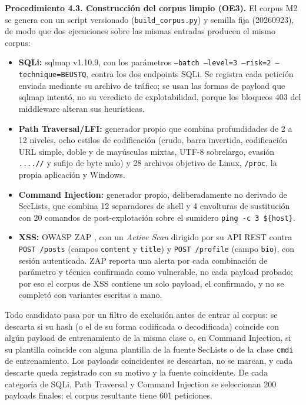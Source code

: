 \textbf{Procedimiento 4.3. Construcción del corpus limpio (OE3).} El corpus M2 se genera con un
script versionado (\texttt{build\_corpus.py}) y semilla fija (20260923), de modo que dos
ejecuciones sobre las mismas entradas producen el mismo corpus:

\begin{itemize}
    \item \textbf{SQLi:} sqlmap \cite{sqlmap} v1.10.9, con los parámetros \texttt{--batch
    --level=3 --risk=2 --technique=BEUSTQ}, contra los dos endpoints SQLi. Se registra cada
    petición enviada mediante su archivo de tráfico; se usan las formas de payload que sqlmap
    intentó, no su veredicto de explotabilidad, porque los bloqueos 403 del middleware alteran
    sus heurísticas.
    \item \textbf{Path Traversal/LFI:} generador propio que combina profundidades de 2 a 12
    niveles, ocho estilos de codificación (crudo, barra invertida, codificación URL simple, doble
    y de mayúsculas mixtas, UTF-8 sobrelargo, evasión \texttt{....//} y sufijo de byte nulo) y 28
    archivos objetivo de Linux, \texttt{/proc}, la propia aplicación y Windows.
    \item \textbf{Command Injection:} generador propio, deliberadamente no derivado de SecLists,
    que combina 12 separadores de shell y 4 envolturas de sustitución con 20 comandos de
    post-explotación sobre el sumidero \texttt{ping -c 3 \$\{host\}}.
    \item \textbf{XSS:} OWASP ZAP \cite{owaspzap}, con un \textit{Active Scan} dirigido por su API REST
    contra \texttt{POST /posts} (campos \texttt{content} y \texttt{title}) y \texttt{POST /profile}
    (campo \texttt{bio}), con sesión autenticada. ZAP reporta una alerta por cada combinación de
    parámetro y técnica confirmada como vulnerable, no cada payload probado; por eso el corpus de
    XSS contiene un solo payload, el confirmado, y no se completó con variantes escritas a mano.
\end{itemize}

Todo candidato pasa por un filtro de exclusión antes de entrar al corpus: se descarta si su hash
(o el de su forma codificada o decodificada) coincide con algún payload de entrenamiento de la
misma clase o, en Command Injection, si su plantilla coincide con alguna plantilla de la fuente
SecLists o de la clase \texttt{cmdi} de entrenamiento. Los payloads coincidentes se descartan, no
se marcan, y cada descarte queda registrado con su motivo y la fuente coincidente. De cada
categoría de SQLi, Path Traversal y Command Injection se seleccionan 200 payloads finales; el corpus
resultante tiene 601 peticiones.

